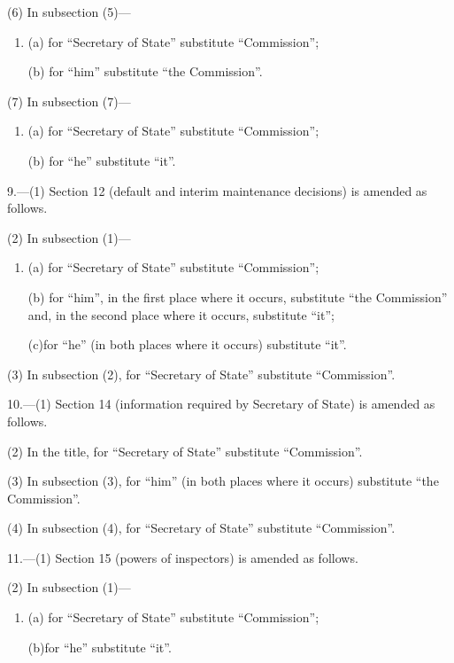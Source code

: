 \documentclass[a4paper]{article}
\begin{document}
(6) In subsection (5)—
\begin{enumerate}\item[]
(a) for “Secretary of State” substitute “Commission”;

(b) for “him” substitute “the Commission”.
\end{enumerate}

(7) In subsection (7)—
\begin{enumerate}\item[]
(a) for “Secretary of State” substitute “Commission”;

(b) for “he” substitute “it”.
\end{enumerate}

\medskip

9.---(1) Section 12 (default and interim maintenance decisions) is amended as follows.

(2) In subsection (1)—
\begin{enumerate}\item[]
(a) for “Secretary of State” substitute “Commission”;

(b) for “him”, in the first place where it occurs, substitute “the Commission” and, in the second place where it occurs, substitute “it”;

(c)for “he” (in both places where it occurs) substitute “it”.
\end{enumerate}

(3) In subsection (2), for “Secretary of State” substitute “Commission”.

\medskip

10.---(1) Section 14 (information required by Secretary of State) is amended as follows.

(2) In the title, for “Secretary of State” substitute “Commission”.

(3) In subsection (3), for “him” (in both places where it occurs) substitute “the Commission”.

(4) In subsection (4), for “Secretary of State” substitute “Commission”.

\medskip

11.---(1) Section 15 (powers of inspectors) is amended as follows.

(2) In subsection (1)—
\begin{enumerate}\item[]
(a) for “Secretary of State” substitute “Commission”;

(b)for “he” substitute “it”.
\end{enumerate}
\end{document}
